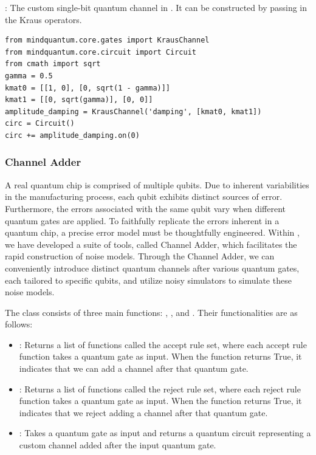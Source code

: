 \KrausChannel: The custom single-bit quantum channel in \MindQuantum. It can be constructed by passing in the Kraus operators.
\begin{lstlisting}
from mindquantum.core.gates import KrausChannel
from mindquantum.core.circuit import Circuit
from cmath import sqrt
gamma = 0.5
kmat0 = [[1, 0], [0, sqrt(1 - gamma)]]
kmat1 = [[0, sqrt(gamma)], [0, 0]]
amplitude_damping = KrausChannel('damping', [kmat0, kmat1])
circ = Circuit()
circ += amplitude_damping.on(0)
\end{lstlisting}

\subsubsection{Channel Adder}
A real quantum chip is comprised of multiple qubits. Due to inherent variabilities in the manufacturing process, each qubit exhibits distinct sources of error. Furthermore, the errors associated with the same qubit vary when different quantum gates are applied. To faithfully replicate the errors inherent in a quantum chip, a precise error model must be thoughtfully engineered. Within \MindQuantum, we have developed a suite of tools, called Channel Adder, which facilitates the rapid construction of noise models. Through the Channel Adder, we can conveniently introduce distinct quantum channels after various quantum gates, each tailored to specific qubits, and utilize noisy simulators to simulate these noise models.

The \ChannelAdder class consists of three main functions: , , and . Their functionalities are as follows:
\begin{itemize}
    \item {}: Returns a list of functions called the accept rule set, where each accept rule function takes a quantum gate as input. When the function returns True, it indicates that we can add a channel after that quantum gate.
    \item {}: Returns a list of functions called the reject rule set, where each reject rule function takes a quantum gate as input. When the function returns True, it indicates that we reject adding a channel after that quantum gate.
    \item {}: Takes a quantum gate as input and returns a quantum circuit representing a custom channel added after the input quantum gate.
\end{itemize}

